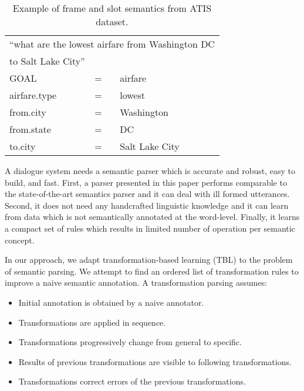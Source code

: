 \documentclass[11pt]{article}
\begin{document}
\begin{table}
\begin{center}
\begin{small}\begin{tabular}{|lll|} 
  \hline
  \multicolumn{3}{l}{``what are the lowest airfare from Washington DC} \\
  \multicolumn{3}{l}{to Salt Lake City''} \\
  \hline
  GOAL          & = & airfare \\
  airfare.type  & = & lowest \\
  from.city     & = & Washington \\
  from.state    & = & DC \\
  to.city       & = & Salt Lake City \\
  \hline
\end{tabular} 
\end{small}\end{center}
\caption{Example of frame and slot semantics from ATIS \cite{atis94} dataset.}
\label{tbl:sem:example}
\end{table}

A dialogue system needs a semantic parser which is accurate and robust, easy to build, and fast. First, a parser presented in this paper performs comparable to the state-of-the-art semantics parser and it can deal with ill formed utterances. Second, it does not need any handcrafted linguistic knowledge and it can learn from data which is not semantically annotated at the word-level. Finally, it learns a compact set of rules which results in limited number of operation per semantic concept.


In our approach, we adapt transformation-based learning (TBL) \cite{brill95} to the problem of semantic parsing. We attempt to find an ordered list of transformation rules to improve a naive semantic annotation. A transformation parsing assumes:
\begin{itemize}
\item Initial annotation is obtained by a naive annotator.
\item Transformations are applied in sequence. 
\item Transformations progressively change from general to specific.
\item Results of previous transformations are visible to following transformations.
\item Transformations correct errors of the previous transformations.
\end{itemize} 
\end{document}
